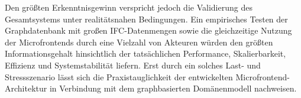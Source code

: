 Den größten Erkenntnisgewinn verspricht jedoch die Validierung des Gesamtsystems unter realitätsnahen Bedingungen. Ein empirisches Testen der Graphdatenbank mit großen IFC-Datenmengen sowie die gleichzeitige Nutzung der Microfrontends durch eine Vielzahl von Akteuren würden den größten Informationsgehalt hinsichtlich der tatsächlichen Performance, Skalierbarkeit, Effizienz und Systemstabilität liefern. Erst durch ein solches Last- und Stressszenario lässt sich die Praxistauglichkeit der entwickelten Microfrontend-Architektur in Verbindung mit dem graphbasierten Domänenmodell nachweisen.